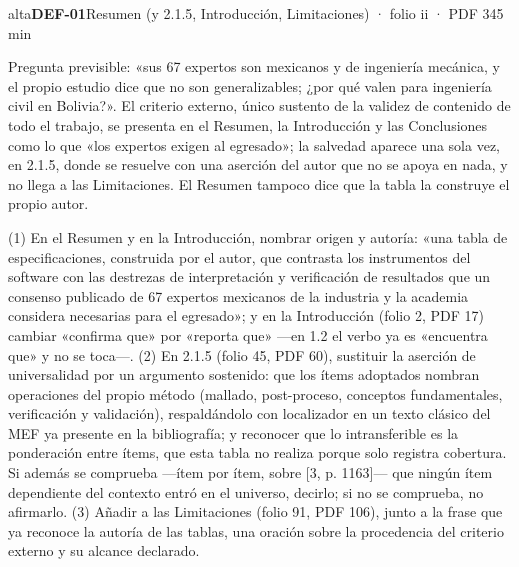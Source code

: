 {\small{}\par}
\begin{ficha}{alta}{\casilla\textbf{DEF-01}\quad{}\quad Resumen (y 2.1.5, Introducción, Limitaciones) · folio ii · PDF 3\hfill 45 min}
\par
{}Pregunta previsible: «sus 67 expertos son mexicanos y de ingeniería mecánica, y el propio estudio dice que no son generalizables; ¿por qué valen para ingeniería civil en Bolivia?». El criterio externo, único sustento de la validez de contenido de todo el trabajo, se presenta en el Resumen, la Introducción y las Conclusiones como lo que «los expertos exigen al egresado»; la salvedad aparece una sola vez, en 2.1.5, donde se resuelve con una aserción del autor que no se apoya en nada, y no llega a las Limitaciones. El Resumen tampoco dice que la tabla la construye el propio autor.\par
{}(1) En el Resumen y en la Introducción, nombrar origen y autoría: «una tabla de especificaciones, construida por el autor, que contrasta los instrumentos del software con las destrezas de interpretación y verificación de resultados que un consenso publicado de 67 expertos mexicanos de la industria y la academia considera necesarias para el egresado»; y en la Introducción (folio 2, PDF 17) cambiar «confirma que» por «reporta que» —en 1.2 el verbo ya es «encuentra que» y no se toca—. (2) En 2.1.5 (folio 45, PDF 60), sustituir la aserción de universalidad por un argumento sostenido: que los ítems adoptados nombran operaciones del propio método (mallado, post-proceso, conceptos fundamentales, verificación y validación), respaldándolo con localizador en un texto clásico del MEF ya presente en la bibliografía; y reconocer que lo intransferible es la ponderación entre ítems, que esta tabla no realiza porque solo registra cobertura. Si además se comprueba —ítem por ítem, sobre [3, p. 1163]\allowbreak{}— que ningún ítem dependiente del contexto entró en el universo, decirlo; si no se comprueba, no afirmarlo. (3) Añadir a las Limitaciones (folio 91, PDF 106), junto a la frase que ya reconoce la autoría de las tablas, una oración sobre la procedencia del criterio externo y su alcance declarado.\par

\end{ficha}
